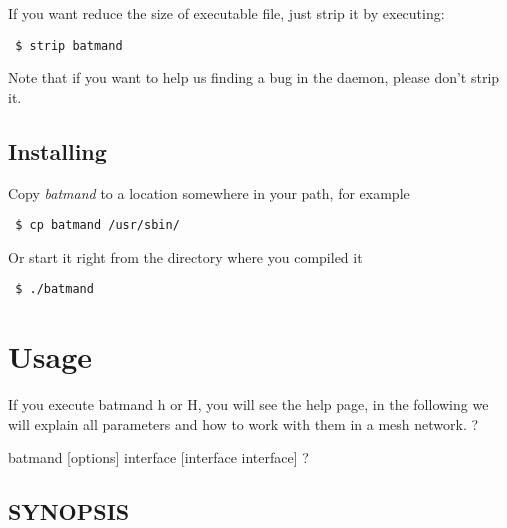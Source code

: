 \documentclass[
	12pt,
	a4paper,
	twoside,
	english,
	headsepline,
	footnosepline,
	automark,
	normalheadings,
	openany,
	cleardoubleplain,
	abstracton,
	idxtotoc,
	liststotoc,
	bibtotoc,
 	BCOR8mm,
]{scrartcl}
\begin{document}
If you want reduce the size of executable file, just strip it by executing: 

\begin{verbatim}
 $ strip batmand
\end{verbatim}

Note that if you want to help us finding a bug in the daemon, please don't strip it.

\subsection{Installing}
Copy \emph{batmand} to a location somewhere in your path, for example
\begin{verbatim}
 $ cp batmand /usr/sbin/
\end{verbatim}
Or start it right from the directory where you compiled it
\begin{verbatim}
 $ ./batmand
\end{verbatim}


\section{Usage}
If you execute batmand  h or  H, you will see the help page, in the following we will explain  all parameters and how to work with them in a mesh network.
?

batmand [options] interface [interface interface]
?

\subsection{SYNOPSIS}
\end{document}
